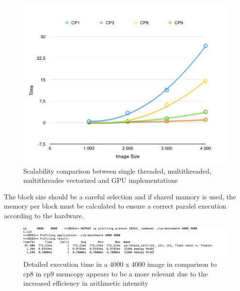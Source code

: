 \documentclass[a4paper,10pt]{article}
\begin{document}
\begin{figure}[H]
\centering
\includegraphics[width=1\textwidth]{figures/w5-comparison}
\caption{Scalability comparison between single threaded, multithreaded, multithreades vectorized and GPU implementations}
\label{fig:pca_type}
\end{figure}

The block size should be a careful selection and if shared mamory is used, the memory per block must be calculated to ensure a correct paralel execution according to the hardware. 

\begin{figure}[H]
\centering
\includegraphics[width=1.3\textwidth]{figures/w5_timing}
\caption{Detailed execution time in a 4000 x 4000 image in comparison to cp8 in cp9 memcopy appears to be a more relevant due to the increased efficiency in arithmetic intensity}
\label{fig:pca_type}
\end{figure}
\end{document}
